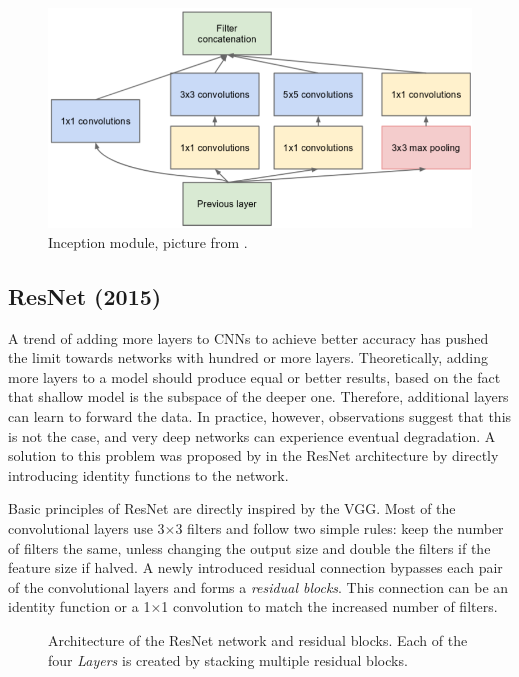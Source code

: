\begin{figure}
    \includegraphics[width=\textwidth]{img/inception}
    \caption[Inception module]%
    {Inception module, picture from \cite[figure 2]{bib:googlenet}.}
    \label{fig:incept_mod}
\end{figure}

\subsection{ResNet (2015)}
\label{sec:resnet}
A trend of adding more layers to CNNs to achieve better accuracy has pushed the limit towards networks with hundred or more layers.  Theoretically, adding more layers to a model should produce equal or better results, based on the fact that shallow model is the subspace of the deeper one. Therefore, additional layers can learn to forward the data. In practice, however, observations suggest that this is not the case, and very deep networks can experience eventual degradation. A solution to this problem was proposed by \citeauthor{bib:resnet} \cite{bib:resnet} in the ResNet architecture by directly introducing identity functions to the network.

Basic principles of ResNet are directly inspired by the VGG. Most of the convolutional layers use 3$\times$3 filters and follow two simple rules: keep the number of filters the same, unless changing the output size and double the filters if the feature size if halved. A newly introduced residual connection bypasses each pair of the convolutional layers and forms a \textit{residual blocks}. This connection can be an identity function or a 1$\times$1 convolution to match the increased number of filters.

\begin{figure}
    \resnetArch
    \caption[ResNet architecture]%
    {Architecture of the ResNet network and residual blocks. Each of the four \textit{Layers} is created by stacking multiple residual blocks.}
    \label{fig:resnet_arch}
\end{figure}

